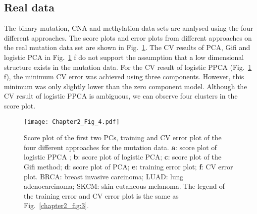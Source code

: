 \subsection{Real data}
The binary mutation, CNA and methylation data sets are analysed using the four different approaches. The score plots and error plots from different approaches on the real mutation data set are shown in Fig.~\ref{chapter2_fig:6}. The CV results of PCA, Gifi and logistic PCA in Fig.~\ref{chapter2_fig:6} f do not support the assumption that a low dimensional structure exists in the mutation data. For the CV result of logistic PPCA (Fig.~\ref{chapter2_fig:6} f), the minimum CV error was achieved using three components. However, this minimum was only slightly lower than the zero component model. Although the CV result of logistic PPCA is ambiguous, we can observe four clusters in the score plot.
\begin{figure}[htbp]
    \centering
    \texttt{[image: Chapter2\_Fig\_4.pdf]}
    \caption{Score plot of the first two PCs, training and CV error plot of the four different approaches for the mutation data. \textbf{a}: score plot of logistic PPCA ; \textbf{b}: score plot of logistic PCA; \textbf{c}: score plot of the Gifi method; \textbf{d}: score plot of PCA; \textbf{e}: training error plot; \textbf{f}: CV error plot. BRCA: breast invasive carcinoma; LUAD: lung adenocarcinoma; SKCM: skin cutaneous melanoma. The legend of the training error and CV error plot is the same as Fig.~\ref{chapter2_fig:3}.}
    \label{chapter2_fig:6}
\end{figure}

